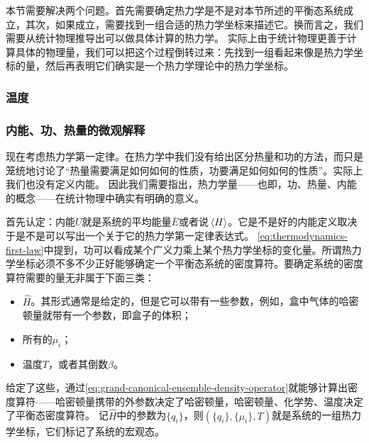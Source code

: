 \documentclass[hyperref, UTF8, a4paper]{ctexart}
\begin{document}
本节需要解决两个问题。首先需要确定热力学是不是对本节所述的平衡态系统成立，其次，如果成立，需要找到一组合适的热力学坐标来描述它。换而言之，我们需要从统计物理推导出可以做具体计算的热力学。
实际上由于统计物理更善于计算具体的物理量，我们可以把这个过程倒转过来：先找到一组看起来像是热力学坐标的量，然后再表明它们确实是一个热力学理论中的热力学坐标。

\subsubsection{温度}


\subsubsection{内能、功、热量的微观解释}

现在考虑热力学第一定律。在热力学中我们没有给出区分热量和功的方法，而只是笼统地讨论了“热量需要满足如何如何的性质，功要满足如何如何的性质”。实际上我们也没有定义内能。
因此我们需要指出，热力学量——也即，功、热量、内能的概念——在统计物理中确实有明确的意义。

首先认定：内能$U$就是系统的平均能量$\bar{E}$或者说$\expval*{H}$。它是不是好的内能定义取决于是不是可以写出一个关于它的热力学第一定律表达式。
\eqref{eq:thermodynamics-first-law}中提到，功可以看成某个广义力乘上某个热力学坐标的变化量。所谓热力学坐标必须不多不少正好能够确定一个平衡态系统的密度算符。要确定系统的密度算符需要的量无非属于下面三类：
\begin{itemize}
    \item $\hat{H}$。其形式通常是给定的，但是它可以带有一些参数，例如，盒中气体的哈密顿量就带有一个参数，即盒子的体积；
    \item 所有的$\mu_i$；
    \item 温度$T$，或者其倒数$\beta$。
\end{itemize}
给定了这些，通过\eqref{eq:grand-canonical-ensemble-density-operator}就能够计算出密度算符——哈密顿量携带的外参数决定了哈密顿量，哈密顿量、化学势、温度决定了平衡态密度算符。
记$\hat{H}$中的参数为$\{q_i\}$，则$(\{q_i\}, \{\mu_i\}, T)$就是系统的一组热力学坐标，它们标记了系统的宏观态。
\end{document}

